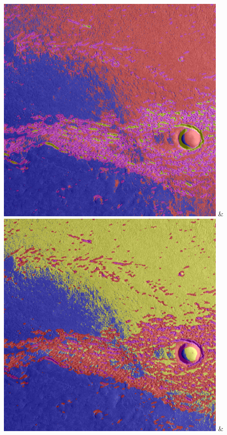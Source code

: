 \begin{table}[h!]
\begin{tabularx}{\textwidth}
		\includegraphics[width=0.9\linewidth]{images/gen/spatial_weight/p03_02.png_0.66.png} &
		\includegraphics[width=0.9\linewidth]{images/gen/spatial_weight/p03_02.png_1.00.png} &

\end{tabularx}
\end{table}
